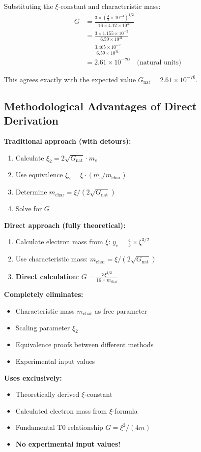 \documentclass[12pt,a4paper]{article}
\theoremstyle{definition}
\begin{document}
Substituting the $\xi$-constant and characteristic mass:
\begin{align}
	G &= \frac{3 \times \left(\frac{4}{3} \times 10^{-4}\right)^{1/2}}{16 \times 4.12 \times 10^{30}} \\
	&= \frac{3 \times 1.155 \times 10^{-2}}{6.59 \times 10^{31}} \\
	&= \frac{3.465 \times 10^{-2}}{6.59 \times 10^{31}} \\
	&= 2.61 \times 10^{-70} \quad \text{(natural units)}
\end{align}

This agrees exactly with the expected value $G_{\text{nat}} = 2.61 \times 10^{-70}$.

\subsection{Methodological Advantages of Direct Derivation}

\textbf{Traditional approach (with detours):}
\begin{enumerate}
	\item Calculate $\xi_2 = 2\sqrt{G_{\text{nat}}} \cdot m_e$
	\item Use equivalence $\xi_2 = \xi \cdot (m_e/m_{\text{char}})$
	\item Determine $m_{\text{char}} = \xi/(2\sqrt{G_{\text{nat}}})$
	\item Solve for $G$
\end{enumerate}

\textbf{Direct approach (fully theoretical):}
\begin{enumerate}
	\item Calculate electron mass from $\xi$: $y_e = \frac{4}{3} \times \xi^{3/2}$
	\item Use characteristic mass: $m_{\text{char}} = \xi/(2\sqrt{G_{\text{nat}}})$
	\item \textbf{Direct calculation}: $G = \frac{3\xi^{1/2}}{16 \times m_{\text{char}}}$
\end{enumerate}

\begin{revolutionary}
	\textbf{Completely eliminates:}
	\begin{itemize}
		\item Characteristic mass $m_{\text{char}}$ as free parameter
		\item Scaling parameter $\xi_2$
		\item Equivalence proofs between different methods
		\item Experimental input values
	\end{itemize}
	
	\textbf{Uses exclusively:}
	\begin{itemize}
		\item Theoretically derived $\xi$-constant
		\item Calculated electron mass from $\xi$-formula
		\item Fundamental T0 relationship $G = \xi^2/(4m)$
		\item \textbf{No experimental input values!}
	\end{itemize}
\end{revolutionary}
\end{document}

